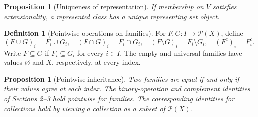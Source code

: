 \documentclass[11pt]{article}
\newtheorem{proposition}[theorem]{Proposition}
\theoremstyle{definition}
\newtheorem{definition}[theorem]{Definition}
\newcommand{\Pow}{\mathcal P}
\begin{document}
\begin{proposition}[Uniqueness of representation]
If membership on $V$ satisfies extensionality, a represented class
has a unique representing set object.
\end{proposition}
\begin{definition}[Pointwise operations on families]
For $F,G:I\to\Pow(X)$, define
\[
(F\cup G)_i=F_i\cup G_i,\quad (F\cap G)_i=F_i\cap G_i,
\quad (F\setminus G)_i=F_i\setminus G_i,\quad (F^c)_i=F_i^c.
\]
Write $F\subseteq G$ if $F_i\subseteq G_i$ for every $i\in I$.
The empty and universal families have values $\varnothing$ and $X$,
respectively, at every index.
\end{definition}
\begin{proposition}[Pointwise inheritance]
Two families are equal if and only if their values agree at each index.
The binary-operation and complement identities of Sections 2--3
hold pointwise for families. The corresponding identities for collections
hold by viewing a collection as a subset of $\Pow(X)$.
\end{proposition}

\newpage
\end{document}
